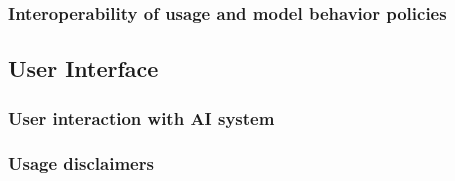 \documentclass{article}
\begin{document}

\subsubsection{Interoperability of usage and model behavior policies}


\subsection{User Interface}
\subsubsection{User interaction with AI system}


\subsubsection{Usage disclaimers}
\end{document}
